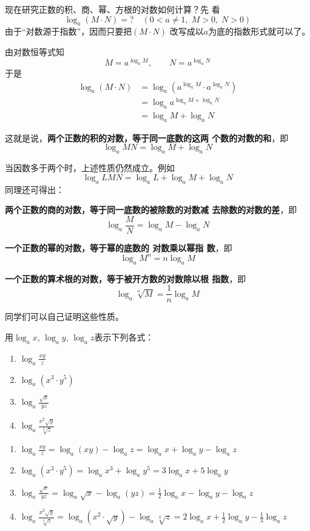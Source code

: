 现在研究正数的积、商、幂、方根的对数如何计算？先
看
\[\log_a (M\cdot N)=?\quad (0<a\ne 1,\; M>0,\; N>0)\]
由于“对数源于指数”，因而只要把$(M\cdot N)$
改写成以$a$为底的指数形式就可以了。

由对数恒等式知
\begin{equation}
    M=a^{\log_a M},\qquad N=a^{\log_a N} \tag{*}
\end{equation}
于是
\[\begin{split}
    \log_a(M\cdot N)&=\log_a\left(a^{\log_a M}\cdot a^{\log_a N}\right)\\
    &=\log_a a^{\log_a M+\log_a N}\\
    &=\log_a M+\log_a N
\end{split}\]

这就是说，\textbf{两个正数的积的对数，等于同一底数的这两
个数的对数的和}，即
\[\log_a MN=\log_a M+\log_a N\]

当因数多于两个时，上述性质仍然成立。例如
\[\log_a LMN=\log_a L+\log_a M+\log_a N\]
同理还可得出：

\textbf{两个正数的商的对数，等于同一底数的被除数的对数减
去除数的对数的差}，即
\[\log_a \frac{M}{N}=\log_a M-\log_a N\]

\textbf{一个正数的幂的对数，等于幂的底数的 对数乘以幂指
数}，即
\[\log_a M^n=n\log_a M\]

\textbf{一个正数的算术根的对数，等于被开方数的对数除以根
指数}，即
\[\log_a\sqrt[n]{M}=\frac{1}{n}\log_a M\]

同学们可以自己证明这些性质。

\begin{example}
用$\log_a x$, $\log_a y$, $\log_a z$表示下列各式：
\begin{multicols}{2}
\begin{enumerate}[(1)]
    \item $\log_a \frac{xy}{z}$
    \item $\log_a (x^3\cdot y^5)$
    \item $\log_a \frac{\sqrt{x}}{yz}$
    \item $\log_a \frac{x^2\sqrt{y}}{\sqrt[3]{z}}$
\end{enumerate}
\end{multicols}
\end{example}

\begin{solution}
\begin{enumerate}[(1)]
    \item $\log_a \frac{xy}{z}=\log_a(xy)-\log_a z=\log_a x+\log_a y-\log_a z$
    \item $\log_a (x^3\cdot y^5)=\log_a x^3+\log_a y^5=3\log_a x+5\log_a y$
    \item $\log_a \frac{\sqrt{x}}{yz}=\log_a\sqrt{x}-\log_a(yz)=\frac{1}{2}\log_a x-\log_a y-\log_a z$
    \item $\log_a \frac{x^2\sqrt{y}}{\sqrt[3]{z}}=\log_a \left(x^2\cdot \sqrt{y}\right)-\log_a\sqrt[3]{z}=2\log_a x+\frac{1}{2}\log_a y-\frac{1}{3}\log_a z$
\end{enumerate}
 \end{solution}
 
